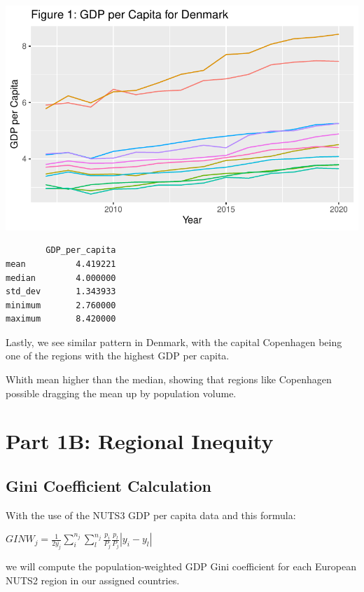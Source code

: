 \documentclass[
  a4paper,
  DIV=11,
  numbers=noendperiod]{scrartcl}
\begin{document}
\includegraphics{MSB104_GR_1_Final_Assignment_research_article_files/figure-pdf/unnamed-chunk-19-1.pdf}

\begin{verbatim}
        GDP_per_capita
mean          4.419221
median        4.000000
std_dev       1.343933
minimum       2.760000
maximum       8.420000
\end{verbatim}

Lastly, we see similar pattern in Denmark, with the capital Copenhagen
being one of the regions with the highest GDP per capita.

Whith mean higher than the median, showing that regions like Copenhagen
possible dragging the mean up by population volume.

\hypertarget{part-1b-regional-inequity}{%
\section{Part 1B: Regional Inequity}\label{part-1b-regional-inequity}}

\hypertarget{gini-coefficient-calculation}{%
\subsection{Gini Coefficient
Calculation}\label{gini-coefficient-calculation}}

With the use of the NUTS3 GDP per capita data and this formula:

\(GINW_j=\frac{1}{2 \bar{y_j}} \sum_{i}^{n_j}\sum_{l}^{n_j}\frac{p_i}{P_j} \frac{p_l}{P_j} |y_i-y_l|\)

we will compute the population-weighted GDP Gini coefficient for each
European NUTS2 region in our assigned countries.
\end{document}
